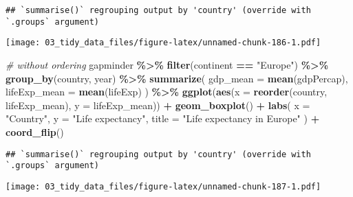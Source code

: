 \documentclass[
]{book}
\newenvironment{Shaded}{\begin{snugshade}}{\end{snugshade}}
\newcommand{\CommentTok}[1]{\textcolor[rgb]{0.56,0.35,0.01}{\textit{#1}}}
\newcommand{\DataTypeTok}[1]{\textcolor[rgb]{0.13,0.29,0.53}{#1}}
\newcommand{\KeywordTok}[1]{\textcolor[rgb]{0.13,0.29,0.53}{\textbf{#1}}}
\newcommand{\NormalTok}[1]{#1}
\newcommand{\OperatorTok}[1]{\textcolor[rgb]{0.81,0.36,0.00}{\textbf{#1}}}
\newcommand{\StringTok}[1]{\textcolor[rgb]{0.31,0.60,0.02}{#1}}
\begin{document}
\begin{verbatim}
## `summarise()` regrouping output by 'country' (override with `.groups` argument)
\end{verbatim}

\texttt{[image: 03\_tidy\_data\_files/figure-latex/unnamed-chunk-186-1.pdf]}

\begin{Shaded}
\begin{Highlighting}[]
\CommentTok{\# without ordering}
\NormalTok{gapminder }\OperatorTok{\%\textgreater{}\%}
\StringTok{  }\KeywordTok{filter}\NormalTok{(continent }\OperatorTok{==}\StringTok{ "Europe"}\NormalTok{) }\OperatorTok{\%\textgreater{}\%}
\StringTok{  }\KeywordTok{group\_by}\NormalTok{(country, year) }\OperatorTok{\%\textgreater{}\%}
\StringTok{  }\KeywordTok{summarize}\NormalTok{(}
    \DataTypeTok{gdp\_mean =} \KeywordTok{mean}\NormalTok{(gdpPercap),}
    \DataTypeTok{lifeExp\_mean =} \KeywordTok{mean}\NormalTok{(lifeExp)}
\NormalTok{  ) }\OperatorTok{\%\textgreater{}\%}
\StringTok{  }\KeywordTok{ggplot}\NormalTok{(}\KeywordTok{aes}\NormalTok{(}\DataTypeTok{x =} \KeywordTok{reorder}\NormalTok{(country, lifeExp\_mean), }\DataTypeTok{y =}\NormalTok{ lifeExp\_mean)) }\OperatorTok{+}
\StringTok{  }\KeywordTok{geom\_boxplot}\NormalTok{() }\OperatorTok{+}
\StringTok{  }\KeywordTok{labs}\NormalTok{(}
    \DataTypeTok{x =} \StringTok{"Country"}\NormalTok{,}
    \DataTypeTok{y =} \StringTok{"Life expectancy"}\NormalTok{,}
    \DataTypeTok{title =} \StringTok{"Life expectancy in Europe"}
\NormalTok{  ) }\OperatorTok{+}
\StringTok{  }\KeywordTok{coord\_flip}\NormalTok{()}
\end{Highlighting}
\end{Shaded}

\begin{verbatim}
## `summarise()` regrouping output by 'country' (override with `.groups` argument)
\end{verbatim}

\texttt{[image: 03\_tidy\_data\_files/figure-latex/unnamed-chunk-187-1.pdf]}
\end{document}
